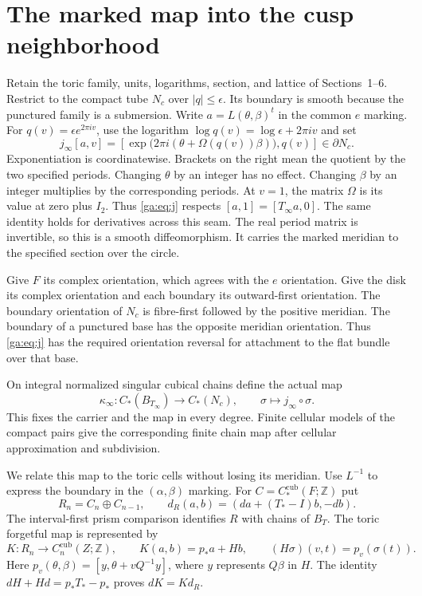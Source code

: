 \section{The marked map into the cusp neighborhood}

Retain the toric family, units, logarithms, section, and lattice
of Sections~1--6. Restrict to the compact tube $N_c$ over $|q|\leq\epsilon$.
Its boundary is smooth because the punctured family is a submersion.
Write $a=L(\theta,\beta)^t$ in the common $e$ marking.
For $q(v)=\epsilon e^{2\pi iv}$, use the logarithm
$\log q(v)=\log\epsilon+2\pi iv$ and set
\begin{equation}\label{ga:eq:j}
j_\infty[a,v]=
\left[\exp\bigl(2\pi i(\theta+\Omega(q(v))\beta)\bigr),q(v)\right]
\in\partial N_c.
\end{equation}
Exponentiation is coordinatewise. Brackets on the right mean the
quotient by the two specified periods.
Changing $\theta$ by an integer has no effect.
Changing $\beta$ by an integer multiplies by the corresponding periods.
At $v=1$, the matrix $\Omega$ is its value at zero plus $I_2$.
Thus \eqref{ga:eq:j} respects $[a,1]=[T_\infty a,0]$.
The same identity holds for derivatives across this seam.
The real period matrix is invertible, so this is a smooth diffeomorphism.
It carries the marked meridian to the specified section over the circle.

Give $F$ its complex orientation, which agrees with the $e$ orientation.
Give the disk its complex orientation and each boundary its outward-first
orientation. The boundary orientation of $N_c$ is fibre-first followed
by the positive meridian. The boundary of a punctured base has the
opposite meridian orientation. Thus \eqref{ga:eq:j} has the required
orientation reversal for attachment to the flat bundle over that base.

On integral normalized singular cubical chains define the actual map
\begin{equation}\label{ga:eq:kappa}
\kappa_\infty:C_*(B_{T_\infty})\longrightarrow C_*(N_c),
\qquad \sigma\longmapsto j_\infty\circ\sigma.
\end{equation}
This fixes the carrier and the map in every degree.
Finite cellular models of the compact pairs give the corresponding
finite chain map after cellular approximation and subdivision.

We relate this map to the toric cells without losing its meridian.
Use $L^{-1}$ to express the boundary in the $(\alpha,\beta)$ marking.
For $C=C_*^{\mathrm{cub}}(F;\mathbb Z)$ put
\[
R_n=C_n\oplus C_{n-1},\qquad
d_R(a,b)=(da+(T_*-I)b,-db).
\]
The interval-first prism comparison identifies $R$ with chains of $B_T$.
The toric forgetful map is represented by
\begin{equation}\label{ga:eq:K}
K:R_n\longrightarrow C_n^{\mathrm{cub}}(Z;\mathbb Z),
\qquad K(a,b)=p_*a+Hb,
\qquad (H\sigma)(v,t)=p_v(\sigma(t)).
\end{equation}
Here $p_v(\theta,\beta)=[y,\theta+vQ^{-1}y]$,
where $y$ represents $Q\beta$ in $H$.
The identity $dH+Hd=p_*T_*-p_*$ proves $dK=Kd_R$.

